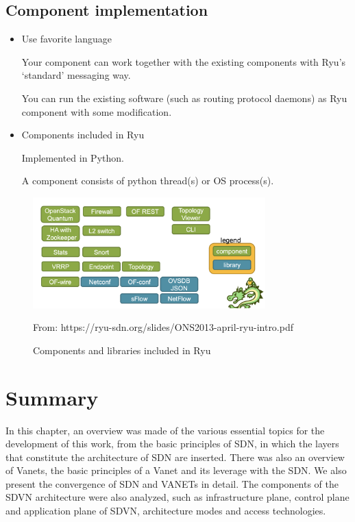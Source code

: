 \documentclass[
  oneside,
  11pt, a4paper,
  footinclude=true,
  headinclude=true,
  cleardoublepage=empty
]{scrbook}
\begin{document}
\subsection{Component implementation}

\begin{itemize}
    \item  Use favorite language \par
    Your component can work together with the existing components with Ryu’s ‘standard’ messaging way.\par
    You can run the existing software (such as routing protocol daemons) as Ryu component with some modification.\par
    \item Components included in Ryu \par
    
    Implemented in Python.\par
    A component consists of python thread(s) or OS process(s).\par
\end{itemize}

\begin{figure}[H]
\begin{center}
  \includegraphics[width=0.8\textwidth]{img/Ryucompo.png}
\end{center}
  \caption{Components and libraries included in Ryu}\par
  From: https://ryu-sdn.org/slides/ONS2013-april-ryu-intro.pdf
  \centering  
\label{Ryu-compo}
\end{figure}


\section{Summary}

In this chapter, an overview was made of the various essential topics for the development of this work, from the basic principles of SDN, in which the layers that constitute the architecture of SDN are inserted. There was also an overview of Vanets, the basic principles of a Vanet and its leverage with the SDN. We also present the convergence of SDN and VANETs in detail. The components of the SDVN architecture were also analyzed, such as infrastructure plane, control plane and application plane of SDVN, architecture modes and access technologies. 
\end{document}
